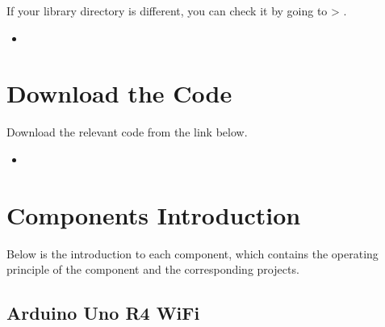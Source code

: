 \documentclass[a4paper,11pt,english]{sphinxmanual}
\let\sphinxpxdimen\pdfpxdimen\else\newdimen\sphinxpxdimen
\begin{document}
\sphinxAtStartPar
If your library directory is different, you can check it by going to  \sphinxhyphen{}\textgreater{} .

\noindent{}

\sphinxAtStartPar
{}
\begin{itemize}
\item {} 
\sphinxAtStartPar
{}

\end{itemize}

\sphinxstepscope


\chapter{Download the Code}
\label{\detokenize{Download_the_Code/Download_the_Code:download-the-code}}\label{\detokenize{Download_the_Code/Download_the_Code::doc}}
\sphinxAtStartPar
Download the relevant code from the link below.
\begin{itemize}
\item {} 
\sphinxAtStartPar
{}

\end{itemize}

\sphinxstepscope


\chapter{Components Introduction}
\label{\detokenize{Components_Kit/Components_Kit:components-introduction}}\label{\detokenize{Components_Kit/Components_Kit::doc}}
\noindent{\hspace*{\fill}\sphinxincludegraphics[width=600\sphinxpxdimen]{{list}.jpg}\hspace*{\fill}}

\sphinxAtStartPar
Below is the introduction to each component, which contains the operating principle of the component and the corresponding projects.

\sphinxstepscope


\section{Arduino Uno R4 WiFi}
\label{\detokenize{Components_Kit/component_UNO_R4:arduino-uno-r4-wifi}}\label{\detokenize{Components_Kit/component_UNO_R4:components-uno-r4-wifi}}\label{\detokenize{Components_Kit/component_UNO_R4::doc}}
\sphinxAtStartPar
{}
\end{document}
